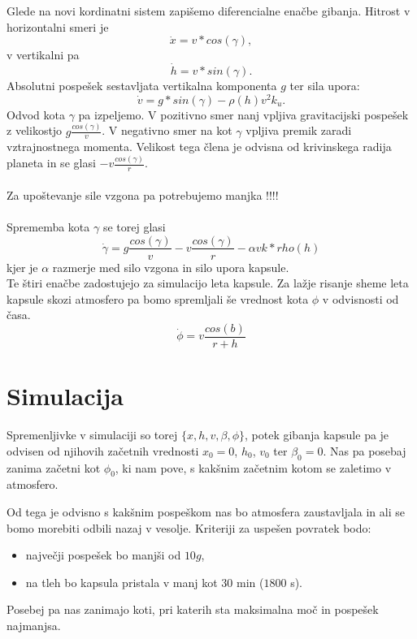 \documentclass[11pt,a4paper]{article}
\begin{document}
Glede na novi kordinatni sistem zapi\v semo diferencialne ena\v cbe gibanja. Hitrost v horizontalni smeri je
\begin{equation}
	\dot{x} = v * cos(\gamma),
\end{equation}
v vertikalni pa
\begin{equation}
	\dot{h} = v * sin(\gamma).
\end{equation}
Absolutni pospe\v sek sestavljata vertikalna komponenta $g$ ter sila upora:
\begin{equation}
	\dot{v} = g*sin(\gamma) - \rho(h) v^2 k_u.
\end{equation}
Odvod kota $\gamma$ pa izpeljemo. V pozitivno smer nanj vpljiva gravitacijski pospe\v sek z velikostjo $g\frac{cos(\gamma)}{v}$. V negativno smer na kot $\gamma$ vpljiva premik zaradi vztrajnostnega momenta. Velikost tega \v clena je odvisna od krivinskega radija planeta in se glasi $ -v \frac{cos(\gamma)}{r}$.\\ \\
Za upo\v stevanje sile vzgona pa potrebujemo manjka !!!\textsl{}! \\\\
Sprememba kota $\gamma$ se torej glasi
\begin{equation}
	\dot{\gamma} = g\frac{cos(\gamma)}{v}  - v \frac{cos(\gamma)}{r} - \alpha v k*rho(h)
\end{equation}
kjer je $\alpha$ razmerje med silo vzgona in silo upora kapsule.\\

Te \v stiri ena\v cbe zadostujejo za simulacijo leta kapsule. Za la\v zje risanje sheme  leta kapsule skozi atmosfero pa bomo spremljali \v se vrednost kota $\phi$ v odvisnosti od \v casa.
\begin{equation}
	\dot{\phi} = v \frac{cos(b)}{r+h}
\end{equation}
\newpage

\section{Simulacija}
Spremenljivke v simulaciji so torej $\{x, h, v, \beta, \phi \}$, potek gibanja kapsule pa je odvisen od njihovih za\v cetnih vrednosti $x_0 = 0$, $h_0$, $v_0$ ter $\beta_0 = 0$. Nas pa posebaj zanima za\v cetni kot $\phi_0$, ki nam pove, s kak\v snim za\v cetnim kotom se zaletimo v atmosfero.

Od tega je odvisno s kak\v snim pospe\v skom nas bo atmosfera zaustavljala in ali se bomo morebiti odbili nazaj v vesolje. Kriteriji za uspe\v sen povratek bodo:
\begin{itemize}
	\item najve\v cji pospe\v sek bo manj\v si od $10 g$,
	\item na tleh bo kapsula pristala v manj kot $30$ min ($1800$ s).
\end{itemize}
Posebej pa nas zanimajo koti, pri katerih sta maksimalna mo\v c in pospe\v sek najmanjsa. \\
\end{document}

